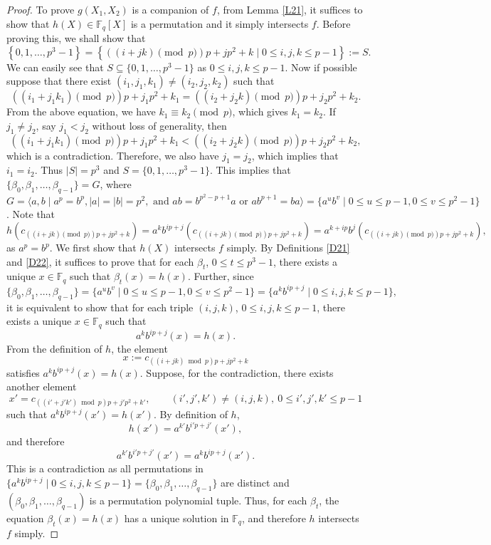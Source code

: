 \documentclass[11pt]{amsart}
\theoremstyle{plain}
\numberwithin{equation}{section}
\def\F{{\mathbb F}}
\begin{document}
\begin{proof}
To prove  $g(X_1,X_2)$ is a companion of $f$, from Lemma \ref{L21}, it suffices to show that $h(X) \in \F_q[X]$ is a permutation and it simply intersects $f$. Before proving this, we shall show that $$\left\{0,1,\ldots,p^3-1\right\}=\left\{\left((i+jk)\pmod  p\right)p+jp^2+k \mid 0 \leq i,j,k \leq p-1\right\}:=S.$$ We can easily see that $S\subseteq \{0,1,\ldots,p^3-1\}$ as $0 \leq i,j,k \leq p-1.$ Now if possible suppose that there exist $(i_1, j_1, k_1) \neq (i_2, j_2, k_2)$ such that 
$$\left((i_1+j_1k_1)\pmod  p\right)p+j_1p^2+k_1=\left((i_2+j_2k)\pmod  p\right)p+j_2p^2+k_2.$$ 
From the above equation, we have $k_1 \equiv k_2 \pmod  p$, which gives $k_1=k_2$. If $j_1 \neq j_2$, say $j_1 < j_2$ without loss of generality, then 
$$\left((i_1+j_1k_1)\pmod  p\right)p+j_1p^2+k_1<\left((i_2+j_2k)\pmod  p\right)p+j_2p^2+k_2,$$ which is a contradiction.
 Therefore, we also have $j_1=j_2$, which implies that $i_1=i_2$. Thus $|S|=p^3$ and $S=\{0,1,\ldots,p^3-1\}$. This implies that $\{\beta_0, \beta_1, \ldots, \beta_{q-1}\}=G$, where $G=\langle a,b \mid a^p=b^p, |a|=|b|=p^2, \text{ and } ab=b^{p^2-p+1}a \text{ or } ab^{p+1}=ba\rangle=\{a^ub^v \mid 0 \leq u \leq p-1, 0\leq v \leq p^2-1\}$. 
Note that 
\[
h(c_{\left((i+jk)\pmod  p\right)p+jp^2+k})=a^{k}b^{ip+j}(c_{\left((i+jk)\pmod  p\right)p+jp^2+k})=a^{k+ip}b^{j}(c_{\left((i+jk)\pmod  p\right)p+jp^2+k}),
\]
as $a^{p} = b^{p}$.  We first show that $h(X)$ intersects $f$ simply. By Definitions \ref{D21} and \ref{D22}, it suffices to prove that for each  
$\beta_t$, $0 \le t \le p^{3}-1$, there exists a unique $x \in \mathbb{F}_{q}$ such that $\beta_t(x)=h(x)$. Further, since  $$\{\beta_0, \beta_1, \ldots, \beta_{q-1}\}=\{a^ub^v \mid 0 \leq u \leq p-1, 0\leq v \leq p^2-1\}=\{a^{k}b^{ip+j}\mid 0 \leq i,j,k \leq p-1\},$$ it is equivalent to show that for each triple $(i,j,k)$, $0 \leq i,j,k \leq p-1$, there exists a unique $x \in \mathbb{F}_{q}$ such that
\[
a^{k} b^{ip+j}(x) = h(x).
\] 
From the definition of $h$, the element
\[
x := c_{((i+jk)\bmod p)p + jp^{2} + k}
\]
satisfies $a^{k} b^{ip+j}(x) = h(x)$. Suppose, for the contradiction, there exists another element
\[
x' = c_{((i'+j'k')\bmod p)p + j'p^{2} + k'},
\qquad (i',j',k') \neq (i,j,k),~ 0 \leq i',j',k' \leq p-1
\]
such that $a^{k} b^{ip+j}(x') = h(x')$.  
By definition of $h$,
\[
h(x') = a^{k'} b^{i'p+j'}(x'),
\]
and therefore
\[
a^{k'} b^{i'p+j'}(x') = a^{k} b^{ip+j}(x').
\]
This is a contradiction as all permutations in $\{a^{k}b^{ip+j}\mid 0 \leq i,j,k \leq p-1\}=\{\beta_0,\beta_1,\ldots,\beta_{q-1}\}$ are distinct and $(\beta_0,\beta_1,\ldots,\beta_{q-1})$ is a permutation polynomial tuple. Thus, for each $\beta_t$, the equation $\beta_t(x)=h(x)$ has a unique solution in $\mathbb{F}_{q}$, and therefore $h$ intersects $f$ simply.
 

\end{proof}
\end{document}
